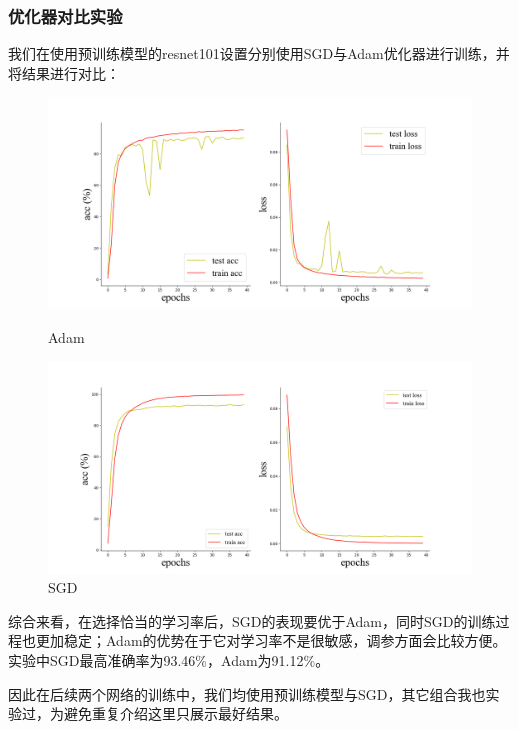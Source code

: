 \documentclass[10.5pt,a4paper]{article}%
\begin{document}
        \subsubsection{优化器对比实验}
            我们在使用预训练模型的resnet101设置分别使用SGD与Adam优化器进行训练，并将结果进行对比：
            \begin{figure}[H]%
            	\centering
            	\begin{minipage}{0.48\textwidth}
            		\centering
            		\includegraphics[width=\textwidth]{resnet101_pretrained_adam.png}
            		\caption{Adam}
            	\end{minipage}
            	\hspace{0cm}%
            	\hfill%
            	\begin{minipage}{0.48\textwidth}
            		\centering
            		\includegraphics[width=\textwidth]{resnet101_pretrained.png}
            		\caption{SGD}
            	\end{minipage}
            \end{figure}
            综合来看，在选择恰当的学习率后，SGD的表现要优于Adam，同时SGD的训练过程也更加稳定；Adam的优势在于它对学习率不是很敏感，调参方面会比较方便。实验中SGD最高准确率为93.46\%，Adam为91.12\%。\par
            因此在后续两个网络的训练中，我们均使用预训练模型与SGD，其它组合我也实验过，为避免重复介绍这里只展示最好结果。
\end{document}
